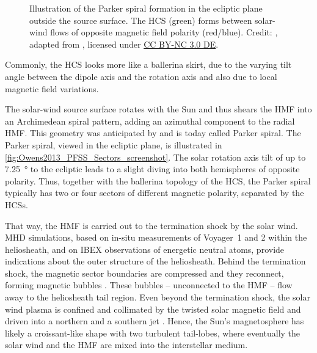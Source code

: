 \begin{figure}[htb]
\begin{floatrow}
{		}{
			\caption{Illustration of the Parker spiral formation in the ecliptic plane outside the source surface. The HCS (green) forms between solar-wind flows of opposite magnetic field polarity (red/blue). Credit: \citet[Fig.~1]{Owens2013}, adapted from \citet[Fig.~1]{Schatten1969}, licensed under \href{https://creativecommons.org/licenses/by-nc/3.0/de/}{CC BY-NC 3.0 DE}.}
			\label{fig:Owens2013_PFSS_Sectors_screenshot}
		}
	\end{floatrow}
\end{figure}
Commonly, the HCS looks more like a ballerina skirt, due to the varying tilt angle between the dipole axis and the rotation axis and also due to local magnetic field variations. 

The solar-wind source surface rotates with the Sun and thus shears the HMF into an Archimedean spiral pattern, adding an azimuthal component to the radial HMF. This geometry was anticipated by \citet{Parker1958} and is today called Parker spiral. The Parker spiral, viewed in the ecliptic plane, is illustrated in \autoref{fig:Owens2013_PFSS_Sectors_screenshot}. The solar rotation axis tilt of up to \SI{7.25}{\degree} to the ecliptic leads to a slight diving into both hemispheres of opposite polarity. Thus, together with the ballerina topology of the HCS, the Parker spiral typically has two or four sectors of different magnetic polarity, separated by the HCSs.

That way, the HMF is carried out to the termination shock by the solar wind. MHD simulations, based on in-situ measurements of Voyager~1 and 2 within the heliosheath, and on IBEX observations of energetic neutral atoms, provide indications about the outer structure of the heliosheath. Behind the termination shock, the magnetic sector boundaries are compressed and they reconnect, forming magnetic bubbles \citep{Opher2011}. These bubbles -- unconnected to the HMF -- flow away to the heliosheath tail region. Even beyond the termination shock, the solar wind plasma is confined and collimated by the twisted solar magnetic field and driven into a northern and a southern jet \citep{Opher2015}. Hence, the Sun's magnetosphere has likely a croissant-like shape with two turbulent tail-lobes, where eventually the solar wind and the HMF are mixed into the interstellar medium.


